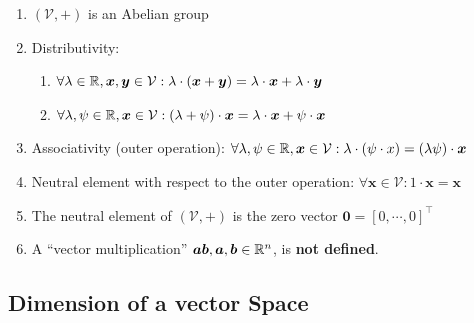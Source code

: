 \begin{enumerate}
    \item $(\mathcal{V}, +)$ is an Abelian group
    \hfill \cite{mfml/book/mml/Deisenroth-Faisal-Ong}

    \item Distributivity:
    \begin{enumerate}
        \item $\forall \lambda  \in  \mathbb{R}, \bm{x}, \bm{y} \in  \mathcal{V} : \lambda  \cdot  (\bm{x} + \bm{y}) = \lambda  \cdot  \bm{x} + \lambda  \cdot  \bm{y}$
        \hfill \cite{mfml/book/mml/Deisenroth-Faisal-Ong}

        \item $\forall \lambda , \psi  \in  \mathbb{R}, \bm{x} \in  \mathcal{V} : (\lambda  + \psi ) \cdot  \bm{x} = \lambda  \cdot  \bm{x} + \psi  \cdot  \bm{x}$
        \hfill \cite{mfml/book/mml/Deisenroth-Faisal-Ong}
    \end{enumerate}

    \item Associativity (outer operation): $\forall \lambda , \psi  \in  \mathbb{R}, \bm{x} \in  \mathcal{V} : \lambda \cdot (\psi \cdot x) = (\lambda \psi )\cdot \bm{x}$
    \hfill \cite{mfml/book/mml/Deisenroth-Faisal-Ong}

    \item Neutral element with respect to the outer operation: $\forall \bm{x} \in  \mathcal{V} : 1\cdot \bm{x} = \bm{x}$
    \hfill \cite{mfml/book/mml/Deisenroth-Faisal-Ong}

    \item The neutral element of $(\mathcal{V}, +)$ is the zero vector $\bm{0} = [0, \cdots , 0]^\top$
    \hfill \cite{mfml/book/mml/Deisenroth-Faisal-Ong}

    \item A “vector multiplication” $\bm{ab}, \bm{a}, \bm{b} \in \mathbb{R}^n$, is \textbf{not defined}.
    \hfill \cite{mfml/book/mml/Deisenroth-Faisal-Ong}
\end{enumerate}


\subsection{Dimension of a vector Space}


